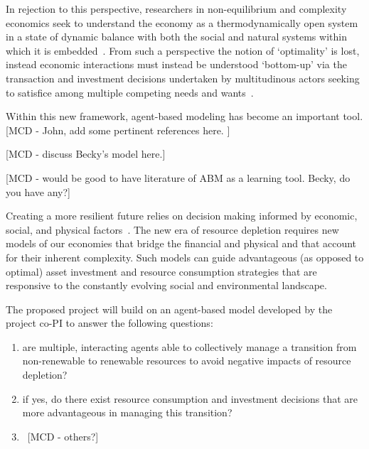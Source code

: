 \documentclass[11pt,a4paper]{article}
\begin{document}
In rejection to this perspective,
researchers in non-equilibrium and complexity economics
seek to understand the economy as a 
thermodynamically open system in a state of dynamic balance
with both the social and natural systems within which it is embedded~\cite{}.
From such a perspective the notion of `optimality' is lost,
instead economic interactions must instead be understood
`bottom-up' via the transaction and investment decisions
undertaken by multitudinous actors seeking to 
satisfice among multiple competing needs and wants~\cite{}.

Within this new framework,
agent-based modeling has become an important tool.
[MCD - John, add some pertinent references here. ]

[MCD - discuss Becky's model here.]

[MCD - would be good to have literature of ABM as a learning tool. 
Becky, do you have any?]

Creating a more resilient future
relies on decision making informed by 
economic, 
social,
and physical factors~\cite{Heun2015}.
The new era of resource depletion requires
new models of our economies that bridge the financial and physical
and that account for their inherent complexity.
Such models can guide advantageous (as opposed to optimal)
asset investment and resource consumption strategies
that are responsive to the constantly evolving 
social and environmental landscape.

The proposed project will build on an agent-based model
developed by the project co-PI to answer the following questions:
\begin{enumerate}
\vspace{-9pt}
\setlength{\itemsep}{-3pt}
	\item	are multiple, interacting agents able to collectively manage 
				a transition from non-renewable to renewable resources 
				to avoid negative impacts of resource depletion?
	\item	if yes, do there exist resource consumption and investment decisions
				that are more advantageous in managing this transition?
	\item	~[MCD - others?]
\end{enumerate}


%
\end{document}
